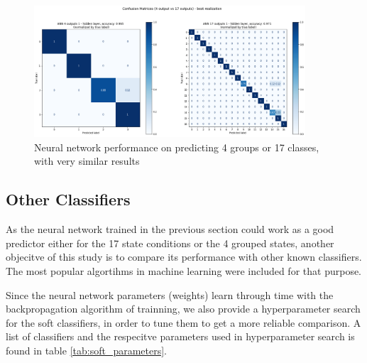 \documentclass[twocolumn]{article}
\begin{document}
\begin{figure}[t!]
      \centering
      \includegraphics[width=0.9\textwidth]{confusion_matrix.png}
      \caption{Neural network performance on predicting 4 groups or 17 classes, with very similar results}
      \label{fig:confusion_matrix}
\end{figure}


\subsection{Other Classifiers}

As the neural network trained in the previous section could work as a good predictor either for the 17 state conditions or the 4 grouped states, another objecitve of this study is to compare its performance with other known classifiers. The most popular algortihms in machine learning were included for that purpose.

Since the neural network parameters (weights) learn through time with the backpropagation algorithm of trainning, we also provide a hyperparameter search for the soft classifiers, in order to tune them to get a more reliable comparison. A list of classifiers and the respecitve parameters used in hyperparameter search is found in table \ref{tab:soft_parameters}.
\end{document}
